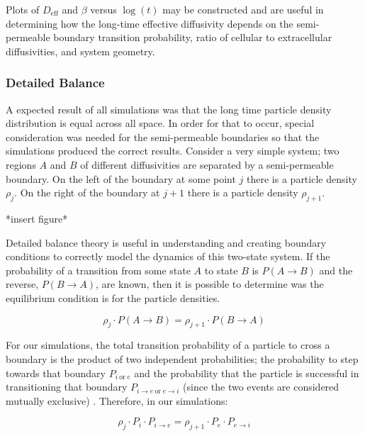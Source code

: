 	Plots of $ D_\textrm{eff} $ and $ \beta $ versus $ \log (t) $ may be constructed and are useful in determining how the long-time effective diffusivity depends on the semi-permeable boundary transition probability, ratio of cellular to extracellular diffusivities, and system geometry.
	
\subsubsection{Detailed Balance}

	A expected result of all simulations was that the long time particle density distribution is equal across all space. In order for that to occur, special consideration was needed for the semi-permeable boundaries so that the simulations produced the correct results. Consider a very simple system; two regions $ A $ and $ B $ of different diffusivities are separated by a semi-permeable boundary. On the left of the boundary at some point $ j $ there is a particle density $ \rho_j $. On the right of the boundary at $ j+1 $ there is a particle density $ \rho_{j+1} $. 
	
	*insert figure*  
	

	Detailed balance theory is useful in understanding and creating boundary conditions to correctly model the dynamics of this two-state system. If the probability of a transition from some state $ A $ to state $ B $ is $ P(A \rightarrow B) $ and the reverse, $ P(B \rightarrow A) $, are known, then it is possible to determine was the equilibrium condition is for the particle densities.
	
	\begin{equation}
		\rho_{j} \cdot P(A \rightarrow B) = \rho_{j+1} \cdot P(B \rightarrow A)
	\end{equation}
	
	For our simulations, the total transition probability of a particle to cross a boundary is the product of two independent probabilities; the probability to step towards that boundary $ P_{i \: \textrm{or} \: e} $ and the probability that the particle is successful in transitioning that boundary $ P_{i \rightarrow e \: \textrm{or} \: e \rightarrow i} $ (since the two events are considered mutually exclusive) \citep{haan}. Therefore, in our simulations:
	
	\begin{equation}
		\rho_{j} \cdot P_{i} \cdot P_{i \rightarrow e} = \rho_{j+1} \cdot P_{e} \cdot P_{e \rightarrow i}
	\end{equation}
	
